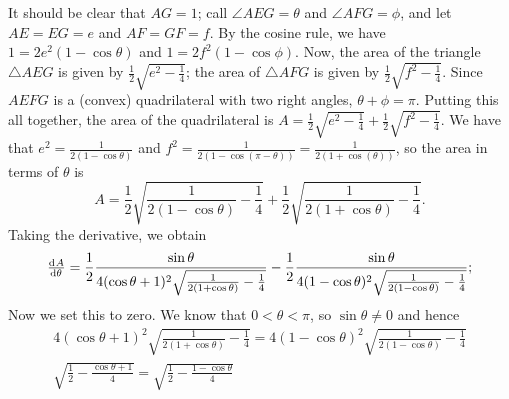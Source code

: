 \begin{enumerate}
\begin{center}
        \end{center}
        It should be clear that $ AG = 1 $; call $ \angle AEG = \theta $ and $ \angle AFG = \phi $, and let $ AE = EG = e $
        and $ AF = GF = f $. By the cosine rule, we have $ 1 = 2e^2  (1 - \cos \theta) $ and $ 1 = 2f^2 (1 - \cos \phi) $. Now,
        the area of the triangle $ \triangle AEG $ is given by $ \frac{1}{2}\sqrt{e^2 - \frac{1}{4}} $; the area of $ \triangle AFG $ is
        given by $ \frac{1}{2}\sqrt{f^2 - \frac{1}{4}} $. Since $ AEFG $ is a (convex) quadrilateral with two right angles, $ \theta + \phi = \pi $.
        Putting this all together, the area of the quadrilateral is $ A = \frac{1}{2}\sqrt{e^2 - \frac{1}{4}} + \frac{1}{2}\sqrt{f^2 - \frac{1}{4}} $. We
        have that $ e^2 = \frac{1}{2(1 - \cos \theta)} $ and $ f^2  = \frac{1}{2(1 - \cos(\pi - \theta))} =\frac{1}{2(1 + \cos(\theta))} $,
        so the area in terms of $ \theta $ is
        \begin{displaymath}
          A = \frac{1}{2}\sqrt{\frac{1}{2(1 - \cos \theta)} - \frac{1}{4}} + \frac{1}{2}\sqrt{\frac{1}{2(1 + \cos \theta)} - \frac{1}{4}}.
        \end{displaymath}
        Taking the derivative, we obtain
        \begin{displaymath}
          \od{A}{\theta} = \frac{1}{2}\frac{\sin \theta}{4(\cos \theta + 1)^2 \sqrt{\frac{1}{2(1 + \cos \theta)} - \frac{1}{4}}}
                         - \frac{1}{2}\frac{\sin \theta}{4(1 - \cos \theta)^2 \sqrt{\frac{1}{2(1 - \cos \theta)} - \frac{1}{4}}};
        \end{displaymath}
        Now we set this to zero. We know that $ 0 < \theta < \pi $, so $ \sin \theta \neq 0 $ and hence
        \begin{gather*}
          4(\cos \theta + 1)^2 \sqrt{\frac{1}{2(1 + \cos \theta)} - \frac{1}{4}}
              = 4(1 - \cos \theta)^2 \sqrt{\frac{1}{2(1 - \cos \theta)} - \frac{1}{4}}\\
          \sqrt{\frac{1}{2} - \frac{\cos \theta + 1}{4}} = \sqrt{\frac{1}{2} - \frac{1 - \cos \theta}{4}}\\

\end{gather*}
\end{enumerate}
